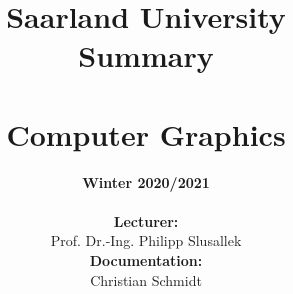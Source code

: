 \documentclass[10pt,fleqn]{report}
\begin{document}
\begin{titlepage}
\title{\vspace{-5cm}\small Saarland University
\mbox{} \vspace{4cm}\\
\small\sansfont Summary \\
\mbox{} \vspace{0.2cm}\\
  {\Huge\sansfont  Computer Graphics}\\}



\author{\scriptsize\sansfont\textbf{Winter 2020/2021}\\
\vspace{1cm}\\
\textbf{\sansfont Lecturer:}\\
Prof. Dr.-Ing. Philipp Slusallek
\vspace{1cm}\\
\textbf{\sansfont Documentation:}\\
Christian Schmidt
}
\date{}
\end{titlepage}
\maketitle


\iffalse
{\Huge Declaration}

\vspace{0.9cm}
\noindent I declare that I have developed and written the enclosed Bachelor Thesis completely by myself, and have not used sources or means without declaration in the text. Finally I thank ...
\fi 

\vspace{14.0cm}


\pagebreak
{\sansfont \small
\tableofcontents
}
\cleardoublepage
{}

{\sansfont
\Large

}



\end{document}
